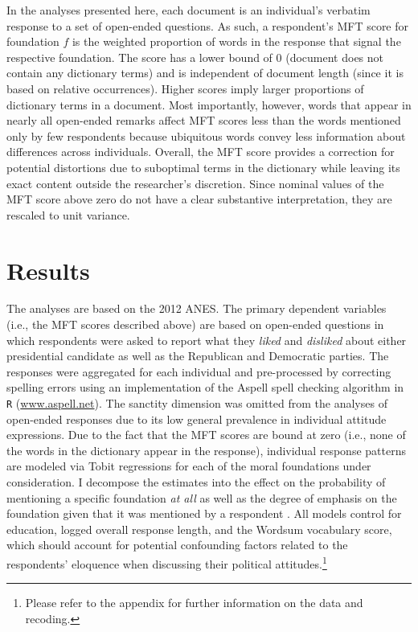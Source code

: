 \documentclass[12pt]{article}
\begin{document}
In the analyses presented here, each document is an individual's verbatim response to a set of open-ended questions. As such, a respondent's MFT score for foundation $f$ is the weighted proportion of words in the response that signal the respective foundation. The score has a lower bound of 0 (document does not contain any dictionary terms) and is independent of document length (since it is based on relative occurrences). Higher scores imply larger proportions of dictionary terms in a document. Most importantly, however, words that appear in nearly all open-ended remarks affect MFT scores less than the words mentioned only by few respondents because ubiquitous words convey less information about differences across individuals. Overall, the MFT score provides a correction for potential distortions due to suboptimal terms in the dictionary while leaving its exact content outside the researcher's discretion. Since nominal values of the MFT score above zero do not have a clear substantive interpretation, they are rescaled to unit variance.


\section*{Results}

The analyses are based on the 2012 ANES. The primary dependent variables (i.e., the MFT scores described above) are based on open-ended questions in which respondents were asked to report what they \textit{liked} and \textit{disliked} about either presidential candidate as well as the Republican and Democratic parties. The responses were aggregated for each individual and pre-processed by correcting spelling errors using an implementation of the Aspell spell checking algorithm in \texttt{R} (\url{www.aspell.net}). The sanctity dimension was omitted from the analyses of open-ended responses due to its low general prevalence in individual attitude expressions. Due to the fact that the MFT scores are bound at zero (i.e., none of the words in the dictionary appear in the response), individual response patterns are modeled via Tobit regressions for each of the moral foundations under consideration. I decompose the estimates into the effect on the probability of mentioning a specific foundation \textit{at all} as well as the degree of emphasis on the foundation given that it was mentioned by a respondent \citep[c.f.][]{mcdonald1980uses}. All models control for education, logged overall response length, and the Wordsum vocabulary score, which should account for potential confounding factors related to the respondents' eloquence when discussing their political attitudes.\footnote{Please refer to the appendix for further information on the data and recoding.}
\end{document}
